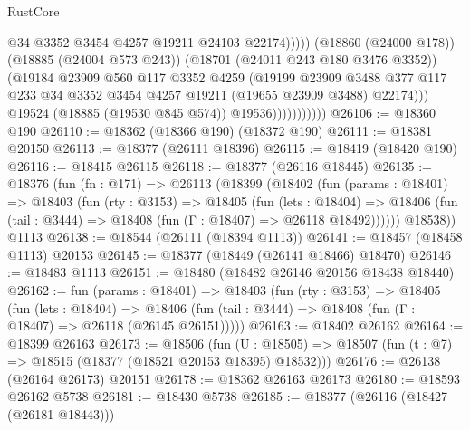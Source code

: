 \begin{lexlean}{RustCore}
\begin{coremodule}
                                      @34
                                      @3352
                                      @3454
                                      @4257
                                      @19211
                                      @24103
                                      @22174)))))
                            (@18860 (@24000 @178))
                            (@18885 (@24004 @573 @243))
                            (@18701 (@24011 @243 @180 @3476 @3352))
                            (@19184
                              @23909
                              @560
                              @117
                              @3352
                              @4259
                              (@19199
                                @23909
                                @3488
                                @377
                                @117
                                @233
                                @34
                                @3352
                                @3454
                                @4257
                                @19211
                                (@19655 @23909 @3488)
                                @22174)))
                          @19524
                          (@18885 (@19530 @845 @574))
                          @19536)))))))))))
@26106 := @18360 @190
@26110 := @18362 (@18366 @190) (@18372 @190)
@26111 := @18381 @20150
@26113 := @18377 (@26111 @18396)
@26115 := @18419 (@18420 @190)
@26116 := @18415 @26115
@26118 := @18377 (@26116 @18445)
@26135 := @18376
    (fun (fn : @171) =>
    @26113
      (@18399
        (@18402
          (fun (params : @18401) =>
          @18403
            (fun (rty : @3153) =>
            @18405
              (fun (lets : @18404) =>
              @18406 (fun (tail : @3444) => @18408 (fun (Γ : @18407) => @26118 @18492))))))
        @18538))
    @1113
@26138 := @18544 (@26111 (@18394 @1113))
@26141 := @18457 (@18458 @1113) @20153
@26145 := @18377 (@18449 (@26141 @18466) @18470)
@26146 := @18483 @1113
@26151 := @18480 (@18482 @26146 @20156 @18438 @18440)
@26162 := fun (params : @18401) =>
  @18403
    (fun (rty : @3153) =>
    @18405
      (fun (lets : @18404) =>
      @18406 (fun (tail : @3444) => @18408 (fun (Γ : @18407) => @26118 (@26145 @26151)))))
@26163 := @18402 @26162
@26164 := @18399 @26163
@26173 := @18506
    (fun (U : @18505) => @18507 (fun (t : @7) => @18515 (@18377 (@18521 @20153 @18395) @18532)))
@26176 := @26138 (@26164 @26173) @20151
@26178 := @18362 @26163 @26173
@26180 := @18593 @26162 @5738
@26181 := @18430 @5738
@26185 := @18377 (@26116 (@18427 (@26181 @18443)))

\end{coremodule}
\end{lexlean}
